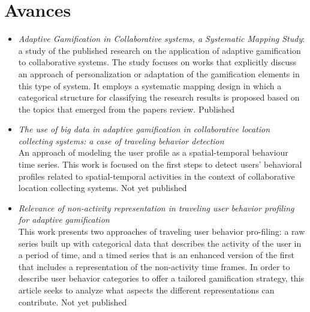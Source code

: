 \documentclass[sigconf]{acmart}
\begin{document}
\section{Avances}
\begin{itemize}
    \item \textit{Adaptive Gamification in Collaborative systems, a Systematic Mapping Study}:  a study of the published research on the application of adaptive gamification to collaborative systems. The study  focuses  on  works  that  explicitly  discuss  an approach  of personalization or adaptation of the gamification elements in this type of system.  It employs a systematic mapping design in which a categorical structure for classifying the research results is proposed based on the topics that emerged from the papers review.  Published \cite{ayastuy_adaptive_2021}
    \item \textit{The use of big data in adaptive gamification in collaborative location collecting systems: a case of traveling behavior detection}\\ An approach of modeling the user profile as a spatial-temporal behaviour time series. This work is focused on the first steps to detect users’ behavioral profiles related to spatial-temporal activities in the context of collaborative location collecting systems. Not yet published
    
    \item \textit{Relevance of non-activity representation in traveling user behavior profiling for adaptive gamification}\\ This work presents two approaches of traveling user behavior pro-filing: a raw series built up with categorical data that describes the activity of the user in a period of time, and a timed series that is an enhanced version of the first that includes a representation of the non-activity time frames. In order to describe user behavior categories to offer a tailored gamification strategy, this article seeks to analyze what aspects the different representations can contribute. Not yet published
\end{itemize}
\end{document}
